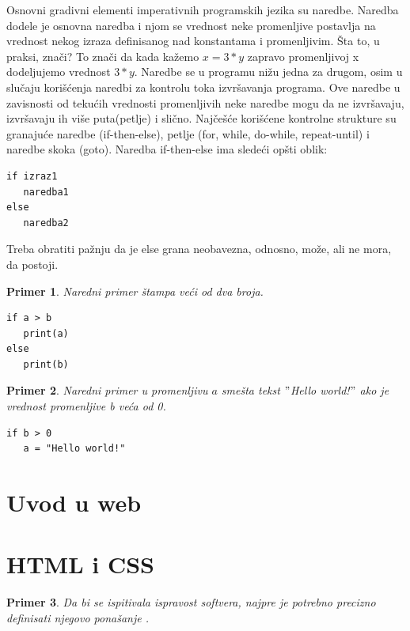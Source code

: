 \documentclass[a4paper]{article}
\newtheorem{primer}{Primer}[section]
\begin{document}
Osnovni gradivni elementi imperativnih programskih jezika su naredbe.
Naredba dodele je osnovna naredba i njom se vrednost neke promenljive postavlja na vrednost nekog izraza definisanog nad konstantama i promenljivim. Šta to, u praksi, znači? To znači da kada kažemo $x = 3*y$ zapravo promenljivoj x dodeljujemo vrednost $3*y$. Naredbe se u programu nižu jedna za drugom, osim u slučaju korišćenja naredbi za kontrolu toka izvršavanja programa. Ove naredbe u zavisnosti od tekućih
vrednosti promenljivih neke naredbe mogu da ne izvršavaju, izvršavaju ih više puta(petlje) i slično. Najčešće korišćene kontrolne strukture su granajuće naredbe (if-then-else), petlje (for, while, do-while, repeat-until) i naredbe skoka (goto). Naredba if-then-else ima sledeći opšti oblik:
\begin{verbatim}
if izraz1 
   naredba1
else 
   naredba2
\end{verbatim}
Treba obratiti pažnju da je else grana neobavezna, odnosno, može, ali ne mora, da postoji. 
\begin{primer}
Naredni primer štampa veći od dva broja.
\begin{verbatim}
if a > b
   print(a)
else
   print(b)
\end{verbatim}
\end{primer}

\begin{primer}
Naredni primer u promenljivu $a$ smešta tekst $"$Hello world!$"$ ako je vrednost promenljive b veća od 0.
\begin{verbatim}
if b > 0
   a = "Hello world!"
\end{verbatim}
\end{primer}


\newpage
\section{Uvod u web}
\label{sec:uvodweb}



\newpage
\section{HTML i CSS}
\label{sec:uvod}

\begin{primer}
 Da bi se ispitivala ispravost softvera, najpre je potrebno precizno definisati njegovo ponašanje \cite{laski2009software}. 
\end{primer}


\end{document}
